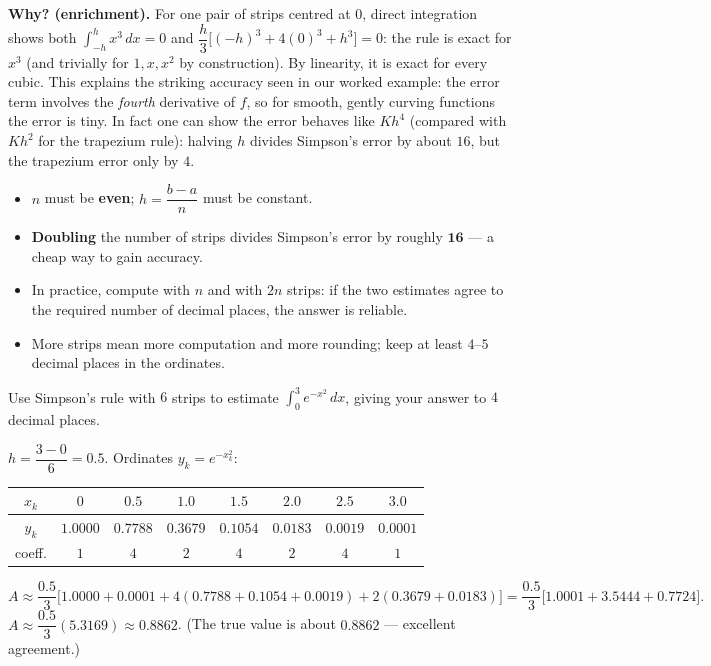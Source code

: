 \documentclass[11pt]{article}
\newcounter{popsec}
\newcounter{popsub}
\newcommand{\courssub}[1]{%
  \stepcounter{popsub}%
  \par\vspace{9pt}\noindent{\popxbold\fontsize{11.5}{13}\selectfont\color{popink}{\color{poporange}\thepopsec.\thepopsub}\hspace{6pt}#1}\par\nopagebreak\vspace{4pt}
}
\begin{document}
\textbf{Why? (enrichment).} For one pair of strips centred at $0$, direct integration shows both $\displaystyle\int_{-h}^{h} x^3\,dx = 0$ and $\dfrac{h}{3}\big[(-h)^3+4(0)^3+h^3\big]=0$: the rule is exact for $x^3$ (and trivially for $1, x, x^2$ by construction). By linearity, it is exact for every cubic. This explains the striking accuracy seen in our worked example: the error term involves the \emph{fourth} derivative of $f$, so for smooth, gently curving functions the error is tiny. In fact one can show the error behaves like $Kh^4$ (compared with $Kh^2$ for the trapezium rule): halving $h$ divides Simpson's error by about $16$, but the trapezium error only by $4$.

\courssub{Choosing the Number of Strips}

\begin{aretenir}
\begin{itemize}
\item $n$ must be \textbf{even}; $h=\dfrac{b-a}{n}$ must be constant.
\item \textbf{Doubling} the number of strips divides Simpson's error by roughly $\mathbf{16}$ --- a cheap way to gain accuracy.
\item In practice, compute with $n$ and with $2n$ strips: if the two estimates agree to the required number of decimal places, the answer is reliable.
\item More strips mean more computation and more rounding; keep at least $4$--$5$ decimal places in the ordinates.
\end{itemize}
\end{aretenir}

\begin{exercice}
Use Simpson's rule with $6$ strips to estimate $\displaystyle\int_0^3 e^{-x^2}\,dx$, giving your answer to $4$ decimal places.
\end{exercice}

\begin{corrige}[Exercise 1]
$h=\dfrac{3-0}{6}=0.5$. Ordinates $y_k=e^{-x_k^2}$:
\begin{center}
\begin{tabular}{|c|c|c|c|c|c|c|c|}
\hline
\rowcolor{popblueL} $x_k$ & $0$ & $0.5$ & $1.0$ & $1.5$ & $2.0$ & $2.5$ & $3.0$ \\ \hline
$y_k$ & $1.0000$ & $0.7788$ & $0.3679$ & $0.1054$ & $0.0183$ & $0.0019$ & $0.0001$ \\ \hline
\rowcolor{popblueL} coeff. & $1$ & $4$ & $2$ & $4$ & $2$ & $4$ & $1$ \\ \hline
\end{tabular}
\end{center}
\[
A \approx \frac{0.5}{3}\Big[1.0000+0.0001 + 4(0.7788+0.1054+0.0019) + 2(0.3679+0.0183)\Big] = \frac{0.5}{3}\big[1.0001+3.5444+0.7724\big].
\]
$A \approx \dfrac{0.5}{3}(5.3169) \approx 0.8862$. (The true value is about $0.8862$ --- excellent agreement.)
\end{corrige}
\end{document}
